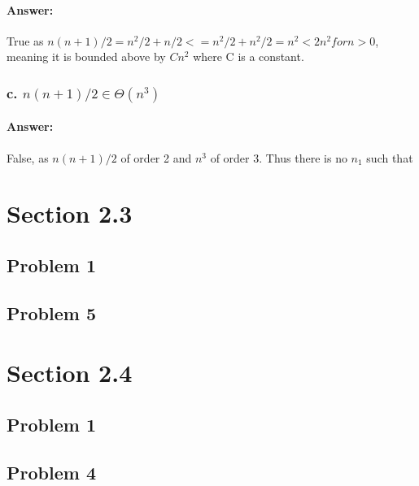 \documentclass{article}
\begin{document}
    \paragraph{Answer:}
      True as $n(n+1)/2 = n^2/2 + n/2 <= n^2/2 + n^2/2 = n^2 < 2n^2 for n>0$, meaning it is bounded above by $Cn^2$ where C is a constant.
  \subsubsection{c. $n(n + 1)/2 \in \Theta(n^3 )$}
    \paragraph{Answer:}
      False, as $n(n+1)/2$ of order 2 and $n^3$ of order 3. Thus there is no $n_{1}$ such that 
\section{Section 2.3}
  \subsection{Problem 1}
  \subsection{Problem 5}
\section{Section 2.4}
  \subsection{Problem 1}
  \subsection{Problem 4}
\end{document}
